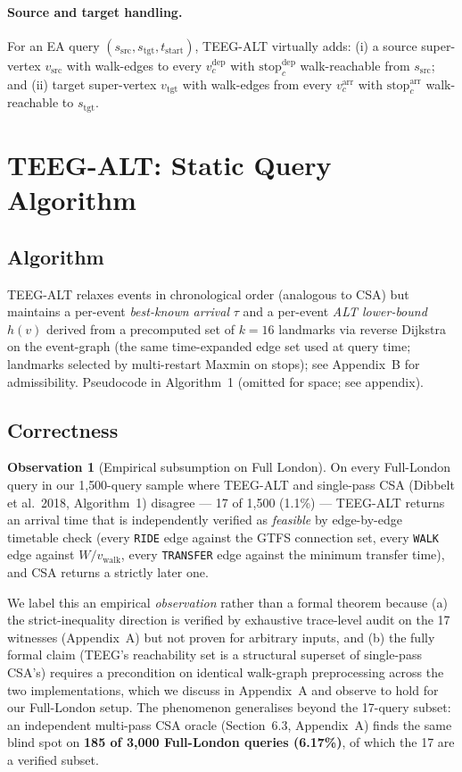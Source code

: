 \documentclass[letterpaper]{article}
\theoremstyle{definition}
\newtheorem{observation}{Observation}
\theoremstyle{plain}
\begin{document}
\paragraph{Source and target handling.} For an EA query
$(s_\text{src}, s_\text{tgt}, t_\text{start})$, TEEG-ALT virtually adds:
(i) a source super-vertex $v_\text{src}$ with walk-edges to every
$v^\text{dep}_c$ with $\text{stop}^\text{dep}_c$ walk-reachable from
$s_\text{src}$; and (ii) target super-vertex $v_\text{tgt}$ with walk-edges
from every $v^\text{arr}_c$ with $\text{stop}^\text{arr}_c$ walk-reachable
to $s_\text{tgt}$.

\section{TEEG-ALT: Static Query Algorithm}
\label{sec:teeg-alt}

\subsection{Algorithm}

TEEG-ALT relaxes events in chronological order (analogous to CSA) but
maintains a per-event \emph{best-known arrival} $\tau$ and a per-event
\emph{ALT lower-bound} $h(v)$ derived from a precomputed set of $k = 16$
landmarks via reverse Dijkstra on the event-graph (the same time-expanded
edge set used at query time; landmarks selected by multi-restart Maxmin
on stops); see Appendix~B for admissibility.
Pseudocode in Algorithm~1 (omitted for space; see appendix).

\subsection{Correctness}

\begin{observation}[Empirical subsumption on Full London]\label{thm:subsum}
On every Full-London query in our 1{,}500-query
sample where TEEG-ALT and single-pass CSA (Dibbelt et al.\ 2018,
Algorithm~1) disagree --- 17 of 1{,}500 (1.1\%) --- TEEG-ALT
returns an arrival time that is independently verified as
\emph{feasible} by edge-by-edge timetable check (every \texttt{RIDE}
edge against the GTFS connection set, every \texttt{WALK} edge against
$W/v_\text{walk}$, every \texttt{TRANSFER} edge against the minimum
transfer time), and CSA returns a strictly later one.
\end{observation}

We label this an empirical \emph{observation} rather than a formal
theorem because (a) the strict-inequality direction is verified by
exhaustive trace-level audit on the 17 witnesses (Appendix~A) but
not proven for arbitrary inputs, and (b) the fully formal claim
(TEEG's reachability set is a structural superset of single-pass
CSA's) requires a precondition on identical walk-graph preprocessing
across the two implementations, which we discuss in Appendix~A and
observe to hold for our Full-London setup. The phenomenon
generalises beyond the 17-query subset: an independent multi-pass
CSA oracle (Section~6.3, Appendix~A) finds the same blind spot on
\textbf{185 of 3{,}000 Full-London queries (6.17\%)}, of which the
17 are a verified subset.
\end{document}
